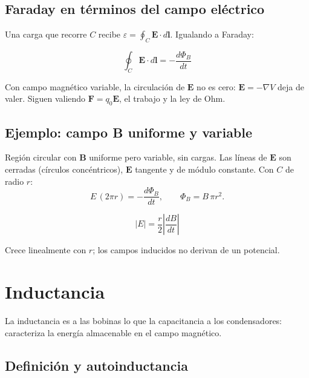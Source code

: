 \documentclass[12pt,a4paper]{article}
\begin{document}
\subsection{Faraday en términos del campo eléctrico}

Una carga que recorre $C$ recibe $\varepsilon = \oint_C \mathbf{E}\cdot
d\mathbf{l}$. Igualando a Faraday:

\begin{keybox}
  \[
  \boxed{\oint_C \mathbf{E}\cdot d\mathbf{l} = -\frac{d\Phi_B}{dt}}
  \]
\end{keybox}

\begin{warnbox}
  Con campo magnético variable, la circulación de $\mathbf{E}$ no es cero:
  $\mathbf{E} = -\nabla V$ deja de valer. Siguen valiendo $\mathbf{F}=q_0
  \mathbf{E}$, el trabajo y la ley de Ohm.
\end{warnbox}

\subsection{Ejemplo: campo B uniforme y variable}

Región circular con $\mathbf{B}$ uniforme pero variable, sin cargas. Las líneas
de $\mathbf{E}$ son cerradas (círculos concéntricos), $\mathbf{E}$ tangente y de
módulo constante. Con $C$ de radio $r$:
\[
E\,(2\pi r) = -\frac{d\Phi_B}{dt}, \qquad \Phi_B = B\,\pi r^2.
\]

\begin{keybox}
  \[
  \boxed{|E| = \frac{r}{2}\left|\frac{dB}{dt}\right|}
  \]
\end{keybox}

Crece linealmente con $r$; los campos inducidos no derivan de un potencial.

\section{Inductancia}

La inductancia es a las bobinas lo que la capacitancia a los condensadores:
caracteriza la energía almacenable en el campo magnético.

\subsection{Definición y autoinductancia}
\end{document}
